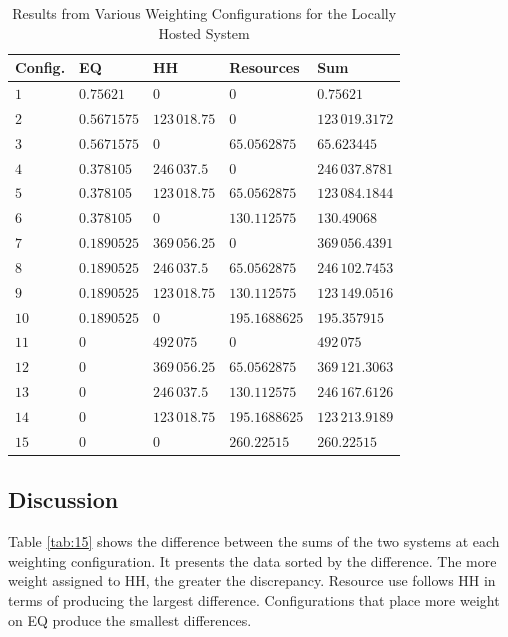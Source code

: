\documentclass[final,journal,10pt,letterpaper,oneside,twocolumn,compsoc]%
{IEEEtran}
\begin{document}
\begin{table}[t!]
  \caption{Results from Various Weighting Configurations for the Locally Hosted
           System}
  \label{tab:14}
  \centering
    \begin{tabular}{| l | l | l | l | l |}
      \hline
      Config. & EQ & HH & Resources & Sum \\
      \hline
      $1$  & $0.75621$   & $0$          & $0$           & $0.75621$ \\
      $2$  & $0.5671575$ & $123\,018.75$  & $0$           & $123\,019.3172$ \\
      $3$  & $0.5671575$ & $0$          & $65.0562875$  & $65.623445$ \\
      $4$  & $0.378105$  & $246\,037.5$   & $0$           & $246\,037.8781$ \\
      $5$  & $0.378105$  & $123\,018.75$  & $65.0562875$  & $123\,084.1844$ \\
      $6$  & $0.378105$  & $0$          & $130.112575$  & $130.49068$ \\
      $7$  & $0.1890525$ & $369\,056.25$  & $0$           & $369\,056.4391$ \\
      $8$  & $0.1890525$ & $246\,037.5$   & $65.0562875$  & $246\,102.7453$ \\
      $9$  & $0.1890525$ & $123\,018.75$  & $130.112575$  & $123\,149.0516$ \\
      $10$ & $0.1890525$ & $0$          & $195.1688625$ & $195.357915$ \\
      $11$ & $0$         & $492\,075$     & $0$           & $492\,075$ \\
      $12$ & $0$         & $369\,056.25$  & $65.0562875$  & $369\,121.3063$ \\
      $13$ & $0$         & $246\,037.5$   & $130.112575$  & $246\,167.6126$ \\
      $14$ & $0$         & $123\,018.75$  & $195.1688625$ & $123\,213.9189$ \\
      $15$ & $0$         & $0$          & $260.22515$   & $260.22515$ \\
      \hline
    \end{tabular}
\end{table}

\subsection{Discussion}
Table \ref{tab:15} shows the difference between the sums of the two systems at
each
weighting configuration. It presents the data sorted by the difference. The more
weight assigned to HH, the greater the discrepancy. Resource use
follows HH in terms of producing the largest difference.
Configurations that place more weight on EQ produce the smallest
differences.
\end{document}
